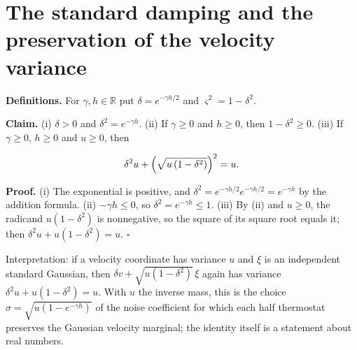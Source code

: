 \documentclass[11pt,a4paper]{article}
\begin{document}
\section{\texorpdfstring{The standard damping and the preservation of the velocity variance}{The standard damping and the preservation of the velocity variance}}


\textbf{Definitions.} For \(\gamma,h\in\mathbb R\) put \(\delta=e^{-\gamma h/2}\) and \(\varsigma^2=1-\delta^2\).




\textbf{Claim.} (i) \(\delta>0\) and \(\delta^2=e^{-\gamma h}\).
(ii) If \(\gamma\ge0\) and \(h\ge0\), then \(1-\delta^2\ge0\).
(iii) If \(\gamma\ge0\), \(h\ge0\) and \(u\ge0\), then


\[\delta^2u+\Bigl(\sqrt{u\,(1-\delta^2)}\Bigr)^2=u .\]


\textbf{Proof.} (i) The exponential is positive, and \(\delta^2=e^{-\gamma h/2}e^{-\gamma h/2}=e^{-\gamma h}\) by the addition formula. (ii) \(-\gamma h\le0\), so \(\delta^2=e^{-\gamma h}\le1\). (iii) By (ii) and \(u\ge0\), the radicand \(u(1-\delta^2)\) is nonnegative, so the square of its square root equals it; then \(\delta^2u+u(1-\delta^2)=u\). \(\square\)




Interpretation: if a velocity coordinate has variance \(u\) and \(\xi\) is an independent standard Gaussian, then \(\delta v+\sqrt{u(1-\delta^2)}\,\xi\) again has variance \(\delta^2u+u(1-\delta^2)=u\). With \(u\) the inverse mass, this is the choice \(\sigma=\sqrt{u(1-e^{-\gamma h})}\) of the noise coefficient for which each half thermostat preserves the Gaussian velocity marginal; the identity itself is a statement about real numbers.
\end{document}
